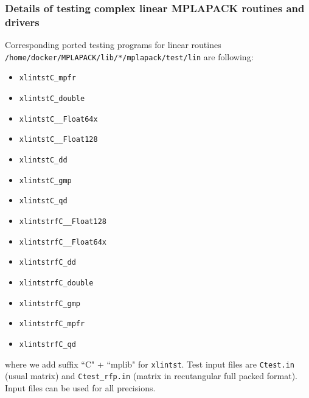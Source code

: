 \documentclass[12pt]{article}
\begin{document}
\subsubsection{Details of testing complex linear MPLAPACK routines and drivers}


Corresponding ported testing programs for linear routines \\
{\tt /home/docker/MPLAPACK/lib/*/mplapack/test/lin} are following:
\begin{itemize}
    \item {\tt xlintstC\_mpfr}
    \item {\tt xlintstC\_double}
    \item {\tt xlintstC\_\_Float64x}
    \item {\tt xlintstC\_\_Float128}
    \item {\tt xlintstC\_dd}
    \item {\tt xlintstC\_gmp}
    \item {\tt xlintstC\_qd}
   \item {\tt xlintstrfC\_\_Float128}
   \item {\tt xlintstrfC\_\_Float64x}
   \item {\tt xlintstrfC\_dd}
   \item {\tt xlintstrfC\_double}
   \item {\tt xlintstrfC\_gmp}
   \item {\tt xlintstrfC\_mpfr}
   \item {\tt xlintstrfC\_qd}
   \end{itemize}
where we add suffix ``C" + ``mplib" for {\tt xlintst}.
Test input files are {\tt Ctest.in} (usual matrix) and {\tt Ctest\_rfp.in} (matrix in recutangular full packed format).
Input files can be used for all precisions.
\end{document}
